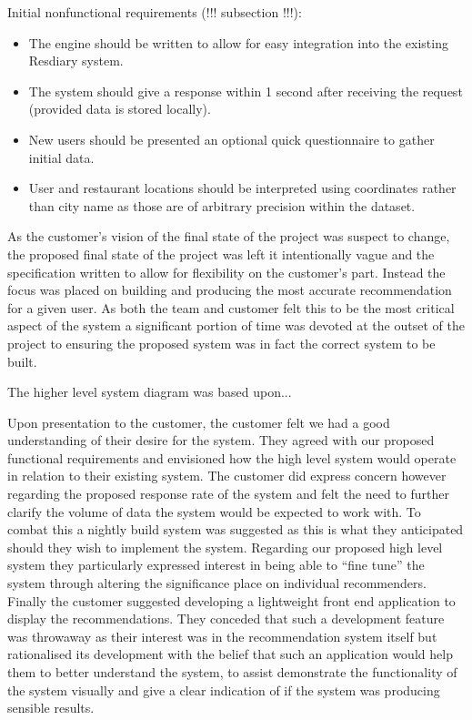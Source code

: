 \documentclass{l3proj}
\begin{document}
Initial nonfunctional requirements (!!! subsection !!!):
\begin{itemize}
\item The engine should be written to allow for easy integration into the existing Resdiary system.
\item The system should give a response within 1 second after receiving the request (provided data is stored locally).
\item New users should be presented an optional quick questionnaire to gather initial data.
\item User and restaurant locations should be interpreted using coordinates rather than city  name as those are of arbitrary precision within the dataset.
\end{itemize}

As the customer’s vision of the final state of the project was suspect to change, the proposed final state of the project was left it intentionally vague and the specification written to allow for flexibility on the customer’s part. Instead the focus was placed on building and producing the most accurate recommendation for a given user. As both the team and customer felt this to be the most critical aspect of the system a significant portion of time was devoted at the outset of the project to ensuring the proposed system was in fact the correct system to be built.  

The higher level system diagram was based upon... 

Upon presentation to the customer, the customer felt we had a good understanding of their desire for the system. They agreed with our proposed functional requirements and envisioned how the high level system would operate in relation to their existing system. The customer did express concern however regarding the proposed response rate of the system and felt the need to further clarify the volume of data the system would be expected to work with. To combat this a nightly build system was suggested as this is what they anticipated should they wish to implement the system. Regarding our proposed high level system they particularly expressed interest in being able to “fine tune” the system through altering the significance place on individual recommenders. Finally the customer suggested developing a lightweight front end application to display the recommendations. They conceded that such a development feature was throwaway as their interest was in the recommendation system itself but rationalised its development with the belief that such an application would help them to better understand the system, to assist demonstrate the functionality of the system visually and give a clear indication of if the system was producing sensible results. 
\end{document}

